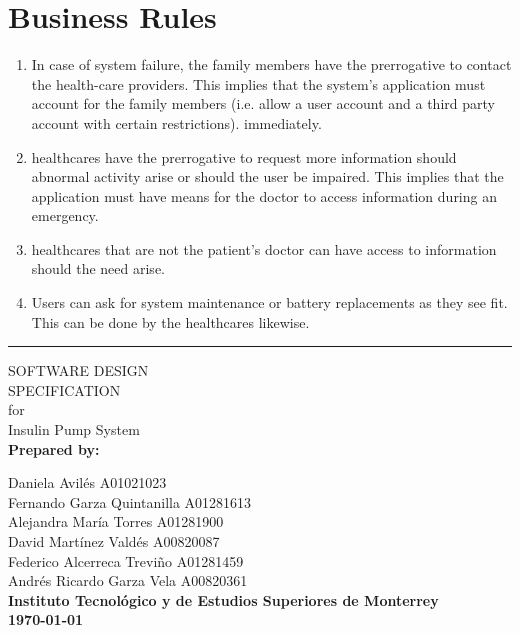 \documentclass{scrreprt}
\begin{document}
\section{Business Rules}
\begin{enumerate}
  \item In case of system failure, the family members have the prerrogative to contact the health-care 
    providers. This implies that the system's application must account for the family members (i.e.
    allow a \gls{user} account and a third party account with certain restrictions).
    immediately.
  \item \Glspl{healthcare} have the prerrogative to request more information should abnormal activity
    arise or should the \gls{user} be impaired. This implies that the application must have means for the
    \gls{doctor} to access information during an emergency.
  \item \Glspl{healthcare} that are not the \gls{patient}'s \gls{doctor} can have access to information should 
    the need arise.
  \item Users can ask for system maintenance or battery replacements as they see fit. This can be done
    by the \glspl{healthcare} likewise.
\end{enumerate}


\clearpage
\begin{flushright}
    \rule{16cm}{5pt}\vskip1cm
    \begin{bfseries}
        \Huge{SOFTWARE DESIGN\\ SPECIFICATION}\\
        \vspace{1cm}
        for\\
        \vspace{1cm}
        Insulin Pump System\\
        \vspace{2cm}
        \Large \textbf{Prepared by:}\\
    \end{bfseries}
        \Large
            Daniela Avil\'{e}s A01021023\\
            Fernando Garza Quintanilla A01281613\\
            Alejandra María Torres A01281900\\
            David Martínez Vald\'{e}s A00820087\\
            Federico Alcerreca Treviño A01281459\\
            Andr\'{e}s Ricardo Garza Vela A00820361\\
        \vspace{2cm}
        \textbf{\Large Instituto Tecnológico y de Estudios Superiores de Monterrey}\\
        \vspace{2cm}
        \textbf{\today}\\
\end{flushright}
\end{document}
